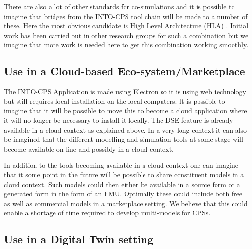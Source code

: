 There are also a lot of other standards for co-simulations \cite{Gomes&18} and it is possible to imagine that bridges from the INTO-CPS tool chain will be made to a number of these. Here the most obvious candidate is High Level Architecture (HLA) \cite{IEEE1516}. Initial work has been carried out in other research groups for such a combination \cite{Awais&17} but we imagine that more work is needed here to get this combination working smoothly.


\subsection{Use in a Cloud-based Eco-system/Marketplace}

The INTO-CPS Application is made using Electron so it is using web technology but still requires local installation on the local computers. It is possible to imagine that it will be possible to move this to become a cloud application where it will no longer be necessary to install it locally. The DSE feature is already available in a cloud context as explained above. In a very long context it can also be imagined that the different modelling and simulation tools at some stage will become available on-line and possibly in a cloud context.

In addition to the tools becoming available in a cloud context one can imagine that it some point in the future will be possible to share constituent models in a cloud context. Such models could then either be available in a source form or a generated form in the form of an FMU. Optimally these could include both free as well as commercial models in a marketplace setting. We believe that this could enable a shortage of time required to develop multi-models for CPSs.

\subsection{Use in a Digital Twin setting}

\cite{Gamble&18}


